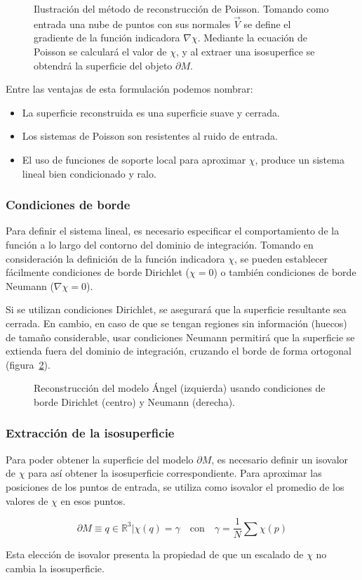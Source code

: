 \begin{figure}
	\caption{\label{fig:poiss_planteo}Ilustración del método de reconstrucción de Poisson.
	Tomando como entrada una nube de puntos con sus normales $\vec{V}$ se define el gradiente de la función
	indicadora $\nabla \chi$. Mediante la ecuación de Poisson se calculará el valor de $\chi$,
	y al extraer una isosuperfice se obtendrá la superficie del objeto $\partial M$. 
	}
\end{figure}

Entre las ventajas de esta formulación podemos nombrar:
\begin{itemize}
	\item La superficie reconstruida es una superficie suave y cerrada.
	\item Los sistemas de Poisson son resistentes al ruido de entrada.
	\item El uso de funciones de soporte local para aproximar $\chi$,
		produce un sistema lineal bien condicionado y ralo.\cite{Kazhdan:2006:PSR:1281957.1281965}
\end{itemize}

	\subsubsection{Condiciones de borde}
	Para definir el sistema lineal, es necesario especificar el
	comportamiento de la función a lo largo del contorno del dominio de
	integración.
	Tomando en consideración la definición de la función indicadora $\chi$,
	se pueden establecer fácilmente condiciones de borde Dirichlet ($\chi = 0$)
	o también condiciones de borde Neumann ($\nabla \chi = 0$).

	Si se utilizan condiciones Dirichlet, se asegurará que la superficie resultante sea cerrada.
	En cambio, en caso de que se tengan regiones sin información (huecos) de tamaño
	considerable, usar condiciones Neumann permitirá que la superficie se
	extienda fuera del dominio de integración, cruzando el borde de forma
	ortogonal (figura~\ref{fig:poisson_boundary})\cite{Kazhdan_screenedpoisson}.
	\begin{figure}
		\caption{\label{fig:poisson_boundary}Reconstrucción del modelo Ángel (izquierda) usando condiciones de borde Dirichlet (centro) y Neumann (derecha).}
	\end{figure}


	\subsubsection{Extracción de la isosuperficie}
	Para poder obtener la superficie del modelo $\partial M$, es necesario
	definir un isovalor de $\chi$ para así obtener la isosuperficie correspondiente.
	Para aproximar las posiciones de los puntos de entrada, se utiliza como isovalor
	el promedio de los valores de $\chi$ en esos puntos.

	\[\partial M \equiv {q \in \mathbb{R}^3 | \chi(q) = \gamma} \quad \mbox{con}
		\quad \gamma = \frac{1}{N} \sum \chi(p) \]

	Esta elección de isovalor presenta la propiedad de que un escalado de $\chi$ no cambia la isosuperficie.
